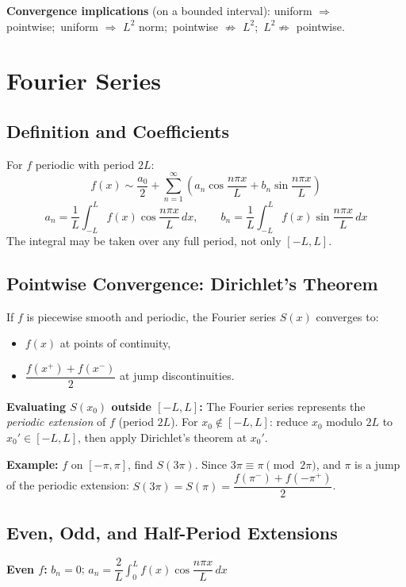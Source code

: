 \documentclass[12pt, a4paper]{article}
\theoremstyle{definition}
\theoremstyle{remark}
\begin{document}
\textbf{Convergence implications} (on a bounded interval):
uniform $\Rightarrow$ pointwise;\ uniform $\Rightarrow$ $L^2$ norm;\ pointwise $\not\Rightarrow$ $L^2$;\ $L^2 \not\Rightarrow$ pointwise.

\section{Fourier Series}

\subsection{Definition and Coefficients}
For $f$ periodic with period $2L$:
\[
  f(x) \sim \frac{a_0}{2} + \sum_{n=1}^\infty
  \left( a_n \cos\frac{n\pi x}{L} + b_n \sin\frac{n\pi x}{L} \right)
\]
\[
  a_n = \frac{1}{L}\int_{-L}^{L} f(x)\cos\frac{n\pi x}{L}\,dx,
  \qquad
  b_n = \frac{1}{L}\int_{-L}^{L} f(x)\sin\frac{n\pi x}{L}\,dx
\]
The integral may be taken over any full period, not only $[-L,L]$.

\subsection{Pointwise Convergence: Dirichlet's Theorem}
If $f$ is piecewise smooth and periodic, the Fourier series $S(x)$ converges to:
\begin{itemize}
  \item $f(x)$ at points of continuity,
  \item $\dfrac{f(x^+)+f(x^-)}{2}$ at jump discontinuities.
\end{itemize}

\textbf{Evaluating $S(x_0)$ outside $[-L,L]$:} The Fourier series represents the \emph{periodic extension}
of $f$ (period $2L$). For $x_0 \notin [-L,L]$: reduce $x_0$ modulo $2L$ to $x_0' \in [-L,L]$,
then apply Dirichlet's theorem at $x_0'$.

\textbf{Example:} $f$ on $[-\pi,\pi]$, find $S(3\pi)$.
Since $3\pi \equiv \pi \pmod{2\pi}$, and $\pi$ is a jump of the periodic extension:
$S(3\pi) = S(\pi) = \dfrac{f(\pi^-)+f(-\pi^+)}{2}$.

\subsection{Even, Odd, and Half-Period Extensions}

\textbf{Even $f$:} $b_n = 0$;\quad
$a_n = \dfrac{2}{L}\displaystyle\int_0^L f(x)\cos\dfrac{n\pi x}{L}\,dx$
\end{document}
